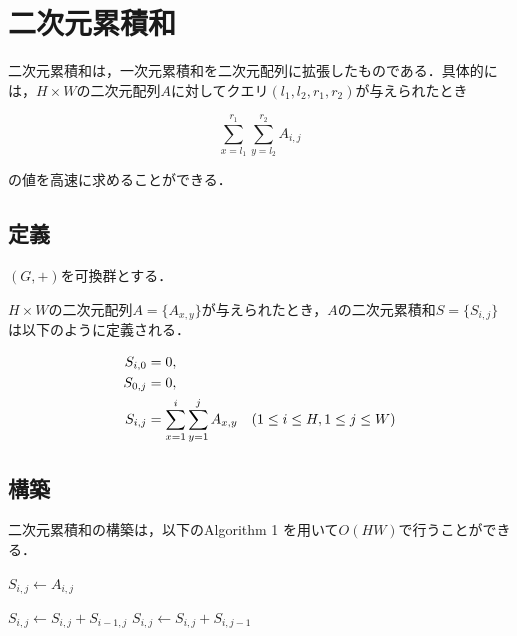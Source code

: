 \documentclass[12pt]{jsreport}
\theoremstyle{plain} %
\theoremstyle{definition}
\begin{document}
\section{二次元累積和}

二次元累積和は，一次元累積和を二次元配列に拡張したものである．具体的には，$H \times W$の二次元配列$A$に対してクエリ$(l_1, l_2, r_1, r_2)$が与えられたとき

\begin{equation}
    \sum_{x=l_1}^{r_1} \sum_{y=l_2}^{r_2} A_{i, j}
\end{equation}

の値を高速に求めることができる．

\subsection{定義}
$(G, +)$を可換群とする．

$H \times W$の二次元配列$A = \{A_{x, y}\}$が与えられたとき，$A$の二次元累積和$S = \{S_{i, j}\}$は以下のように定義される．

\begin{align}
    S_{i, 0} &= 0, \notag \\
    S_{0, j} &= 0, \notag \\
    S_{i, j} &= \sum_{x=1}^{i} \sum_{y=1}^{j} A_{x, y} \quad (1 \leq i \leq H, 1 \leq j \leq W)
\end{align}

\subsection{構築}
二次元累積和の構築は，以下のAlgorithm 1 を用いて$O(HW)$で行うことができる．

\begin{algorithm}
    \caption{二次元累積和の構築}
    \begin{algorithmic}[1]
        \STATE $S_{i, j} \leftarrow A_{i,j}$
        \ENDFOR
        \ENDFOR

        \STATE
        \STATE {}
        \STATE $S_{i, j} \leftarrow S_{i, j} + S_{i-1, j}$
        \ENDFOR
        \ENDFOR
        \STATE $S_{i, j} \leftarrow S_{i, j} + S_{i, j-1}$
        \ENDFOR
        \ENDFOR

    \end{algorithmic}
\end{algorithm}
\end{document}
